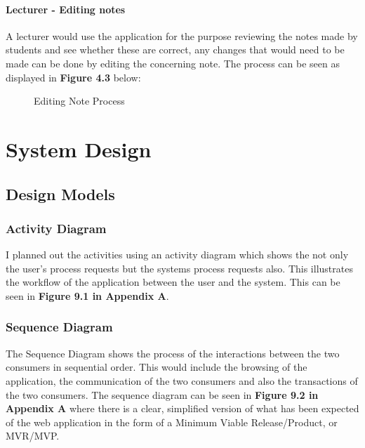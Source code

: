\documentclass[oneside]{report}
\begin{document}
			\subsubsection{Lecturer - Editing notes}
			A lecturer would use the application for the purpose reviewing the notes made by students and see whether these are correct, any changes that would need to be made can be done by editing the concerning note. The process can be seen as displayed in \textbf{Figure 4.3} below:

		\begin{figure}[H]
			\begin{center}
			\end{center}
			\caption[Editing Note Process]{Editing Note Process}
		\end{figure}



\chapter{System Design}
	\section{Design Models}
		\subsection{Activity Diagram}
		I planned out the activities using an activity diagram which shows the not only the user's process requests but the systems process requests also. This illustrates the workflow of the application between the user and the system. This can be seen in \textbf{Figure 9.1 in Appendix A}.

		\subsection{Sequence Diagram}
		The Sequence Diagram shows the process of the interactions between the two consumers in sequential order. This would include the browsing of the application, the communication of the two consumers and also the transactions of the two consumers. The sequence diagram can be seen in \textbf{Figure 9.2 in Appendix A} where there is a clear, simplified version of what has been expected of the web application in the form of a Minimum Viable Release/Product, or MVR/MVP.
\end{document}
